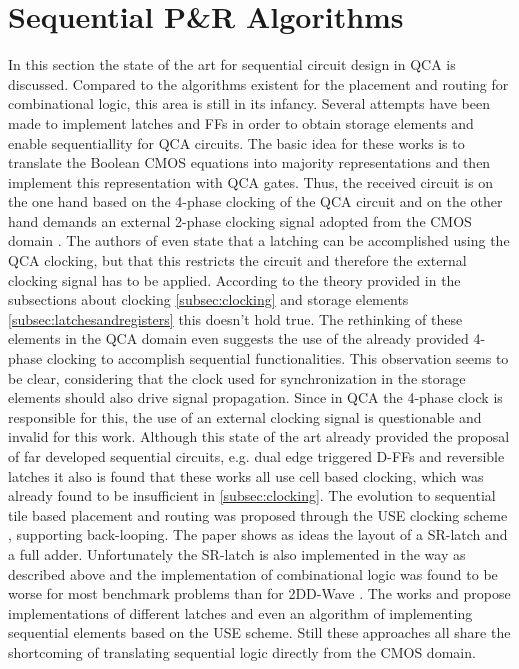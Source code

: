 \section{Sequential P\&R Algorithms}
In this section the state of the art for sequential circuit design in QCA is discussed. Compared to the algorithms existent for the placement and routing for combinational logic, this area is still in its infancy. Several attempts \cite{sequential_cell_one, sequential_cell_two, dual_edge_triggered_FF_cell, sequential_reversible_cell} have been made to implement latches and FFs in order to obtain storage elements and enable sequentiallity for QCA circuits. The basic idea for these works is to translate the Boolean CMOS equations into majority representations and then implement this representation with QCA gates. Thus, the received circuit is on the one hand based on the 4-phase clocking of the QCA circuit and on the other hand demands an external 2-phase clocking signal adopted from the CMOS domain \cite{sequential_cell_one}. The authors of \cite{sequential_cell_two} even state that a latching can be accomplished using the QCA clocking, but that this restricts the circuit and therefore the external clocking signal has to be applied. According to the theory provided in the subsections about clocking \ref{subsec:clocking} and storage elements \ref{subsec:latchesandregisters} this doesn't hold true. The rethinking of these elements in the QCA domain even suggests the use of the already provided 4-phase clocking to accomplish sequential functionalities. This observation seems to be clear, considering that the clock used for synchronization in the storage elements should also drive signal propagation. Since in QCA the 4-phase clock is responsible for this, the use of an external clocking signal is questionable and invalid for this work. Although this state of the art already provided the proposal of far developed sequential circuits, e.g. dual edge triggered D-FFs \cite{dual_edge_triggered_FF_cell} and reversible latches \cite{sequential_reversible_cell} it also is found that these works all use cell based clocking, which was already found to be insufficient in \ref{subsec:clocking}. The evolution to sequential tile based placement and routing was proposed through the USE clocking scheme \cite{USE}, supporting back-looping. The paper shows as ideas the layout of a SR-latch and a full adder. Unfortunately the SR-latch is also implemented in the way as described above and the implementation of combinational logic was found to be worse for most benchmark problems than for 2DD-Wave \cite{Walter}. The works \cite{sequential_reversible_tile} and \cite{sequential_tile_CMOS_alg} propose implementations of different latches and even an algorithm of implementing sequential elements based on the USE scheme. Still these approaches all share the shortcoming of translating sequential logic directly from the CMOS domain.\\

